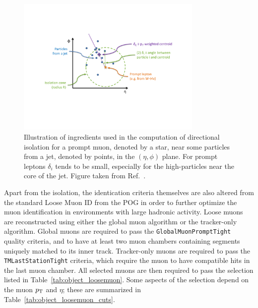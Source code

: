 \begin{figure}[htpb]
  \centering
  \includegraphics[width=0.8\textwidth]{figures/eventreco_objects/directional_iso_cartoon}
  \caption{Illustration of ingredients used in the computation of directional isolation for a prompt
muon, denoted by a star, near some particles from a jet, denoted by points, in the $(\eta,\phi)$
plane. For prompt leptons $\delta_i$ tends to be small, especially for the high-\pt particles near
the core of the jet. Figure taken from Ref.~\cite{CMS-AN2011-498}.
  \label{fig:object_directional_iso}}
\end{figure}

Apart from the isolation, the identication criteria themselves are also altered from the standard
Loose Muon ID from the POG in order to further optimize the muon identification in environments
with large hadronic activity. 
Loose muons are reconstructed using either the global muon algorithm or the tracker-only
algorithm. 
Global muons are required to pass the {\tt GlobalMuonPromptTight} quality criteria,
and to have at least two muon chambers containing segments uniquely matched to its inner track. 
Tracker-only muons are required to pass the {\tt TMLastStationTight} criteria, which require the
muon to have compatible hits in the last muon chamber. 
All selected muons are then required to pass the selection listed in
Table~\ref{tab:object_loosemuon}. 
Some aspects of the selection depend on the muon $p_{\mathrm{T}}$ and $\eta$; these are summarized in
Table~\ref{tab:object_loosemuon_cuts}.

